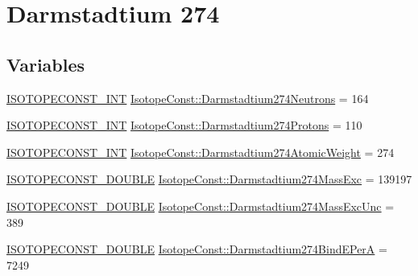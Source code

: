 \hypertarget{group___isotope_const-_darmstadtium-_ds274}{}\section{Darmstadtium 274}
\label{group___isotope_const-_darmstadtium-_ds274}
\subsection*{Variables}
\begin{DoxyCompactItemize}
\item 
\mbox{\hyperlink{group___isotope_const-_macros_ga5f18360b3e99483a35c32d789e62621c}{I\+S\+O\+T\+O\+P\+E\+C\+O\+N\+S\+T\+\_\+\+I\+NT}} \mbox{\hyperlink{group___isotope_const-_darmstadtium-_ds274_gaadaef4bf80993086dd70d3dc3761705f}{Isotope\+Const\+::\+Darmstadtium274\+Neutrons}} = 164
\item 
\mbox{\hyperlink{group___isotope_const-_macros_ga5f18360b3e99483a35c32d789e62621c}{I\+S\+O\+T\+O\+P\+E\+C\+O\+N\+S\+T\+\_\+\+I\+NT}} \mbox{\hyperlink{group___isotope_const-_darmstadtium-_ds274_gad4663fc137270b8d35aeb43e91f67083}{Isotope\+Const\+::\+Darmstadtium274\+Protons}} = 110
\item 
\mbox{\hyperlink{group___isotope_const-_macros_ga5f18360b3e99483a35c32d789e62621c}{I\+S\+O\+T\+O\+P\+E\+C\+O\+N\+S\+T\+\_\+\+I\+NT}} \mbox{\hyperlink{group___isotope_const-_darmstadtium-_ds274_gaf84e26c3f2c33c78bfd5dd4f774d9a4d}{Isotope\+Const\+::\+Darmstadtium274\+Atomic\+Weight}} = 274
\item 
\mbox{\hyperlink{group___isotope_const-_macros_ga8f45a7272ce02c0b4c65c44636ed719a}{I\+S\+O\+T\+O\+P\+E\+C\+O\+N\+S\+T\+\_\+\+D\+O\+U\+B\+LE}} \mbox{\hyperlink{group___isotope_const-_darmstadtium-_ds274_ga3f0cf4dbb75b013c1da143f4be7356c8}{Isotope\+Const\+::\+Darmstadtium274\+Mass\+Exc}} = 139197
\item 
\mbox{\hyperlink{group___isotope_const-_macros_ga8f45a7272ce02c0b4c65c44636ed719a}{I\+S\+O\+T\+O\+P\+E\+C\+O\+N\+S\+T\+\_\+\+D\+O\+U\+B\+LE}} \mbox{\hyperlink{group___isotope_const-_darmstadtium-_ds274_gab8fb6f314c5b624e770fc5093e4878c0}{Isotope\+Const\+::\+Darmstadtium274\+Mass\+Exc\+Unc}} = 389
\item 
\mbox{\hyperlink{group___isotope_const-_macros_ga8f45a7272ce02c0b4c65c44636ed719a}{I\+S\+O\+T\+O\+P\+E\+C\+O\+N\+S\+T\+\_\+\+D\+O\+U\+B\+LE}} \mbox{\hyperlink{group___isotope_const-_darmstadtium-_ds274_gaf112f083a01f10bf3a8a23ae205e1119}{Isotope\+Const\+::\+Darmstadtium274\+Bind\+E\+PerA}} = 7249

\end{DoxyCompactItemize}

